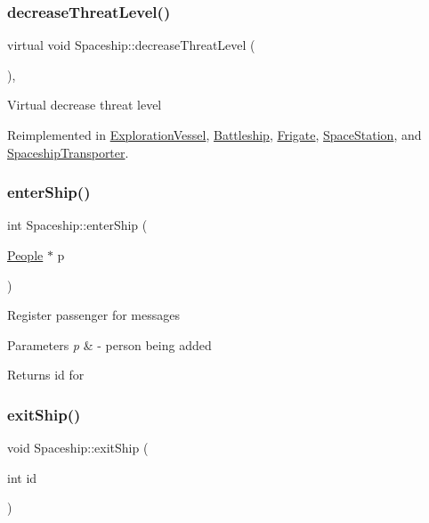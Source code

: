 \subsubsection{\texorpdfstring{decrease\+Threat\+Level()}{decreaseThreatLevel()}}
{\footnotesize\ttfamily virtual void Spaceship\+::decrease\+Threat\+Level (\begin{DoxyParamCaption}{ }\end{DoxyParamCaption})\hspace{0.3cm}{\ttfamily [inline]}, {\ttfamily [virtual]}}

Virtual decrease threat level 

Reimplemented in \hyperlink{classExplorationVessel_afac2ec0016d6934629418074e3de5950}{Exploration\+Vessel}, \hyperlink{classBattleship_a31ab6421ece477f4de7989b31aa8ed02}{Battleship}, \hyperlink{classFrigate_a756cc705b54d5aa48d4529bbfbeee74f}{Frigate}, \hyperlink{classSpaceStation_a0cb67593dc02495793635adb66f595e9}{Space\+Station}, and \hyperlink{classSpaceshipTransporter_aab6415c16cb8e3fd511a995846099068}{Spaceship\+Transporter}.

\mbox{\label{classSpaceship_a3ed78b14953957576e42c6e741e04690}} 
\subsubsection{\texorpdfstring{enter\+Ship()}{enterShip()}}
{\footnotesize\ttfamily int Spaceship\+::enter\+Ship (\begin{DoxyParamCaption}\item[{\hyperlink{classPeople}{People} $\ast$}]{p }\end{DoxyParamCaption})\hspace{0.3cm}{\ttfamily [virtual]}}

Register passenger for messages 
\begin{DoxyParams}{Parameters}
{\em p} & -\/ person being added \\
\hline
\end{DoxyParams}
\begin{DoxyReturn}{Returns}
id for 
\end{DoxyReturn}
\mbox{\label{classSpaceship_ae3ddb55d813fa2a3454c1745b23cf6ef}} 
\subsubsection{\texorpdfstring{exit\+Ship()}{exitShip()}}
{\footnotesize\ttfamily void Spaceship\+::exit\+Ship (\begin{DoxyParamCaption}\item[{int}]{id }\end{DoxyParamCaption})\hspace{0.3cm}{\ttfamily [virtual]}}

